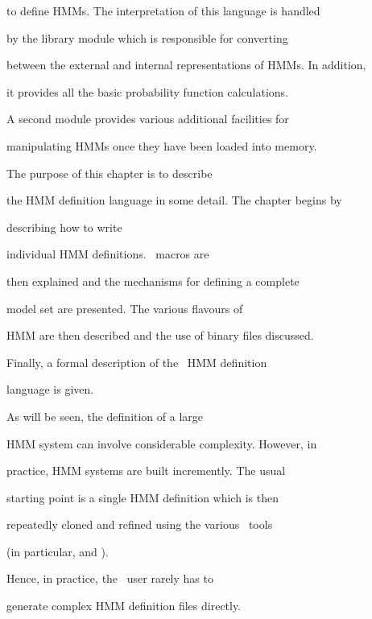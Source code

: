 to define HMMs.  The interpretation of this language is handled


by the library module  which is responsible for converting


between the external and internal representations of HMMs.  In addition,


it provides all the basic probability function calculations.


A second module  provides various additional facilities for


manipulating HMMs once they have been loaded into memory.





The purpose of this chapter is to describe


the HMM definition language in some detail.  The chapter begins by 


describing how to write


individual HMM definitions.  \HTK\ macros are


then explained and the mechanisms for defining a complete


model set are presented.  The various flavours of


HMM are then described and the use of binary files discussed.


Finally, a formal description of the \HTK\ HMM definition


language is given.





As will be seen, the definition of a large 


HMM system can involve considerable complexity.  However, in


practice, HMM systems are built incremently.  The usual 


starting point is a single HMM definition which is then


repeatedly cloned and refined using the various \HTK\ tools


(in particular,  and ).


Hence, in practice, the \HTK\ user rarely has to 


generate complex HMM definition files directly.  










